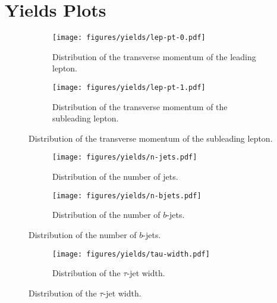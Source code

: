 \clearpage

\section{Yields Plots}
\label{appendix:yields}

\begin{figure}[hbt!]
    \centering
    \begin{subfigure}{0.45\textwidth}
        \texttt{[image: figures/yields/lep-pt-0.pdf]}
        \caption{Distribution of the transverse momentum of the leading lepton.}
    \end{subfigure}\hfill%
    \begin{subfigure}{0.45\textwidth}
        \texttt{[image: figures/yields/lep-pt-1.pdf]}
        \caption{Distribution of the transverse momentum of the subleading lepton.}
    \end{subfigure}
\end{figure}

\begin{figure}[htb]
    \centering
    \begin{subfigure}{0.45\textwidth}
        \texttt{[image: figures/yields/n-jets.pdf]}
        \caption{Distribution of the number of jets.}
    \end{subfigure}\hfill%
    \begin{subfigure}{0.45\textwidth}
        \texttt{[image: figures/yields/n-bjets.pdf]}
        \caption{Distribution of the number of $b$-jets.}
    \end{subfigure}
\end{figure}

\begin{figure}[htb]
    \centering
    \begin{subfigure}{0.8\textwidth}
        \texttt{[image: figures/yields/tau-width.pdf]}
        \caption{Distribution of the $\tau$-jet width.}
    \end{subfigure}\hfill%
\end{figure}

\clearpage